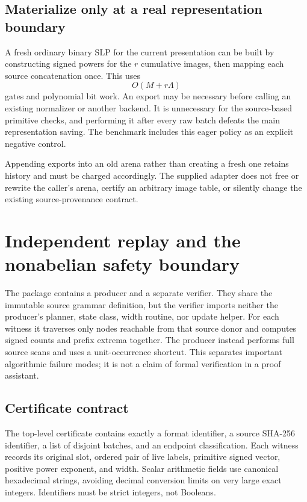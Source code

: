 \documentclass[11pt,letterpaper]{article}
\theoremstyle{definition}
\theoremstyle{remark}\newtheorem{remark}[theorem]{Remark}
\begin{document}
\subsection{Materialize only at a real representation boundary}

A fresh ordinary binary SLP for the current presentation can be built by
constructing signed powers for the $r$ cumulative images, then mapping each
source concatenation once. This uses
\[
 O(M+r\Lambda)
\]
gates and polynomial bit work. An export may be necessary before calling an
existing normalizer or another backend. It is unnecessary for the source-based
primitive checks, and performing it after every raw batch defeats the main
representation saving. The benchmark includes this eager policy as an explicit
negative control.

Appending exports into an old arena rather than creating a fresh one retains
history and must be charged accordingly. The supplied adapter does not free
or rewrite the caller's arena, certify an arbitrary image table, or silently
change the existing source-provenance contract.

\section{Independent replay and the nonabelian safety boundary}
\label{sec:verification}

The package contains a producer and a separate verifier. They share the
immutable source grammar definition, but the verifier imports neither the
producer's planner, state class, width routine, nor update helper. For each
witness it traverses only nodes reachable from that source donor and computes
signed counts and prefix extrema together. The producer instead performs full
source scans and uses a unit-occurrence shortcut. This separates important
algorithmic failure modes; it is not a claim of formal verification in a proof
assistant.

\subsection{Certificate contract}

The top-level certificate contains exactly a format identifier, a source
SHA-256 identifier, a list of disjoint batches, and an endpoint classification.
Each witness records its original slot, ordered pair of live labels, primitive
signed vector, positive power exponent, and width. Scalar arithmetic fields
use canonical hexadecimal strings, avoiding decimal conversion limits on
very large exact integers. Identifiers must be strict integers, not Booleans.
\end{document}
